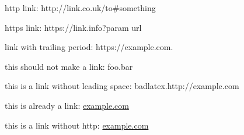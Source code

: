 

http link: http://link.co.uk/to\#something

https link: https://link.info?param url

link with trailing period: https://example.com.

this should not make a link: foo.bar

this is a link without leading space: badlatex.http://example.com

this is already a link: \href{http://example.com}{example.com}

this is a link without http: \href{example.com}{example.com}


